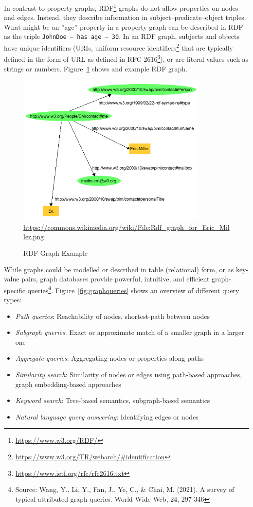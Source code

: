 In contrast to property graphs, RDF\footnote{\url{https://www.w3.org/RDF/}} graphs do not allow properties on nodes and edges. Instead, they describe information in subject--predicate--object triples. What might be an ''age'' property in a property graph can be described in RDF as the triple \texttt{JohnDoe -- has age -- 30}. In an RDF graph, subjects and objects have unique identifiers (URIs, uniform resource identifiers\footnote{\url{https://www.w3.org/TR/webarch/\#identification}} that are typically defined in the form of URL as defined in RFC 2616\footnote{\url{https://www.ietf.org/rfc/rfc2616.txt}}), or are literal values such as strings or numbers. Figure~\ref{fig:rdfgraph} shows and example RDF graph.

\begin{figure}[h]
\centering
\includegraphics[height=3in]{rdf.png}
\scriptsize{\url{https://commons.wikimedia.org/wiki/File:Rdf_graph_for_Eric_Miller.png}}
\caption{RDF Graph Example}
\label{fig:rdfgraph}
\end{figure}

While graphs could be modelled or described in table (relational) form, or as key-value pairs, graph databases provide powerful, intuitive, and efficient graph-specific queries\footnote{Source: Wang, Y., Li, Y., Fan, J., Ye, C., \& Chai, M. (2021). A survey of typical attributed graph queries. World Wide Web, 24, 297-346}. Figure~\ref{fig:graphqueries} shows an overview of different query types:

\begin{itemize}
	\item \emph{Path queries}: Reachability of nodes, shortest-path between nodes
	\item \emph{Subgraph queries}: Exact or approximate match of a smaller graph in a larger one
	\item \emph{Aggregate queries}: Aggregating nodes or properties along paths
	\item \emph{Similarity search}: Similarity of nodes or edges using path-based approaches, graph embedding-based approaches
	\item \emph{Keyword search}: Tree-based semantics, subgraph-based semantics
	\item \emph{Natural language query answering}: Identifying edges or nodes
\end{itemize}

